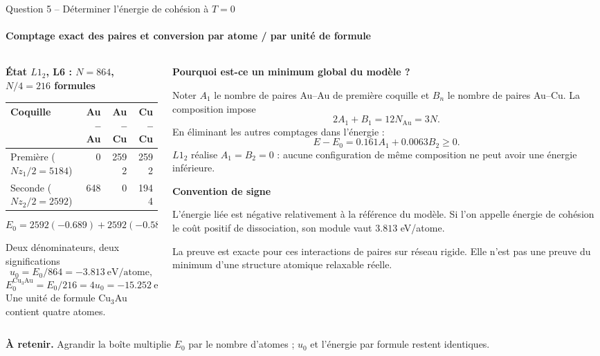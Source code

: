 \documentclass[aspectratio=169,10pt]{beamer}
\newcommand{\Au}{\mathrm{Au}}
\newcommand{\Cu}{\mathrm{Cu}}
\newcommand{\notecrit}[1]{\par\smallskip{\color{gold}\bfseries Lecture critique.} #1\par}
\newcommand{\takeaway}[1]{\par\smallskip\colorbox{pale}{\parbox{\dimexpr\linewidth-2\fboxsep\relax}{\strut\textbf{À retenir.} #1\strut}}}
\begin{document}
\begin{frame}[t]{Question 5 -- Déterminer l'énergie de cohésion à $T=0$}
\framesubtitle{Comptage exact des paires et conversion par atome / par unité de formule}
\begin{columns}[T,onlytextwidth]
\begin{column}{.49\textwidth}
\textbf{État $L1_2$, L6 : $N=864$, $N/4=216$ formules}
\begin{center}
\begin{tabular}{lrrr}\toprule
Coquille & Au--Au & Au--Cu & Cu--Cu\\\midrule
Première ($Nz_1/2=5184$) & 0 & 2592 & 2592\\
Seconde ($Nz_2/2=2592$) & 648 & 0 & 1944\\\bottomrule
\end{tabular}
\end{center}
\[
E_0=2592(-0.689)+2592(-0.582)
=\boxed{-3294.432\ \mathrm{eV}}.
\]
\begin{block}{Deux dénominateurs, deux significations}
\[
u_0=E_0/864=\boxed{-3.813\ \mathrm{eV/atome}},
\]
\[
E_0^{\Cu_3\Au}=E_0/216=4u_0
=\boxed{-15.252\ \mathrm{eV/formule}}.
\]
Une unité de formule Cu$_3$Au contient quatre atomes.
\end{block}
\end{column}
\begin{column}{.48\textwidth}
\textbf{Pourquoi est-ce un minimum global du modèle ?}

Noter $A_1$ le nombre de paires Au--Au de première coquille et $B_n$ le nombre de paires Au--Cu.
La composition impose
\[
2A_1+B_1=12N_{\Au}=3N.
\]
En éliminant les autres comptages dans l'énergie :
\[
\boxed{E-E_0=0.161A_1+0.0063B_2\geq0}.
\]
$L1_2$ réalise $A_1=B_2=0$ : aucune configuration de même composition ne peut avoir une énergie inférieure.

\textbf{Convention de signe}

L'énergie liée est négative relativement à la référence du modèle. Si l'on appelle énergie de cohésion le coût positif de dissociation, son module vaut $3.813$ eV/atome.
\notecrit{La preuve est exacte pour ces interactions de paires sur réseau rigide. Elle n'est pas une preuve du minimum d'une structure atomique relaxable réelle.}
\end{column}
\end{columns}
\takeaway{Agrandir la boîte multiplie $E_0$ par le nombre d'atomes ; $u_0$ et l'énergie par formule restent identiques.}
\end{frame}
\end{document}
